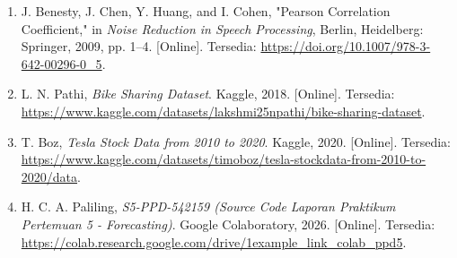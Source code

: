 \begin{enumerate}
    \item \label{benesty} J. Benesty, J. Chen, Y. Huang, and I. Cohen, "Pearson Correlation Coefficient," in \textit{Noise Reduction in Speech Processing}, Berlin, Heidelberg: Springer, 2009, pp. 1--4. [Online]. Tersedia: \url{https://doi.org/10.1007/978-3-642-00296-0_5}.
    
    \item \label{kaggleBikesharing} L. N. Pathi, \textit{Bike Sharing Dataset}. Kaggle, 2018. [Online]. Tersedia: \url{https://www.kaggle.com/datasets/lakshmi25npathi/bike-sharing-dataset}.
    
    \item \label{kaggleTesla} T. Boz, \textit{Tesla Stock Data from 2010 to 2020}. Kaggle, 2020. [Online]. Tersedia: \url{https://www.kaggle.com/datasets/timoboz/tesla-stockdata-from-2010-to-2020/data}.
    
    \item \label{colabLaporan} H. C. A. Paliling, \textit{S5-PPD-542159 (Source Code Laporan Praktikum Pertemuan 5 - Forecasting)}. Google Colaboratory, 2026. [Online]. Tersedia: \url{https://colab.research.google.com/drive/1example_link_colab_ppd5}.
\end{enumerate}
